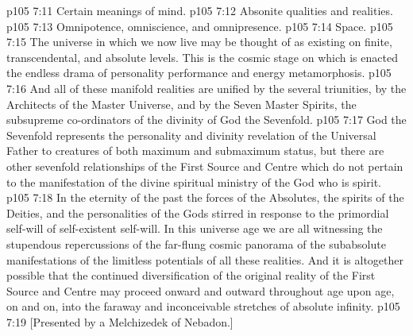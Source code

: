 \vs p105 7:11 \bibnobreakspace Certain meanings of mind.
\vs p105 7:12 \bibnobreakspace Absonite qualities and realities.
\vs p105 7:13 \bibnobreakspace Omnipotence, omniscience, and omnipresence.
\vs p105 7:14 \bibnobreakspace Space.
\vs p105 7:15 \pc The universe in which we now live may be thought of as existing on finite, transcendental, and absolute levels. This is the cosmic stage on which is enacted the endless drama of personality performance and energy metamorphosis.
\vs p105 7:16 And all of these manifold realities are unified  by the several triunities,  by the Architects of the Master Universe, and  by the Seven Master Spirits, the subsupreme co\hyp{}ordinators of the divinity of God the Sevenfold.
\vs p105 7:17 God the Sevenfold represents the personality and divinity revelation of the Universal Father to creatures of both maximum and submaximum status, but there are other sevenfold relationships of the First Source and Centre which do not pertain to the manifestation of the divine spiritual ministry of the God who is spirit.
\vs p105 7:18 \pc In the eternity of the past the forces of the Absolutes, the spirits of the Deities, and the personalities of the Gods stirred in response to the primordial self\hyp{}will of self\hyp{}existent self\hyp{}will. In this universe age we are all witnessing the stupendous repercussions of the far\hyp{}flung cosmic panorama of the subabsolute manifestations of the limitless potentials of all these realities. And it is altogether possible that the continued diversification of the original reality of the First Source and Centre may proceed onward and outward throughout age upon age, on and on, into the faraway and inconceivable stretches of absolute infinity.
\vsetoff
\vs p105 7:19 [Presented by a Melchizedek of Nebadon.]
